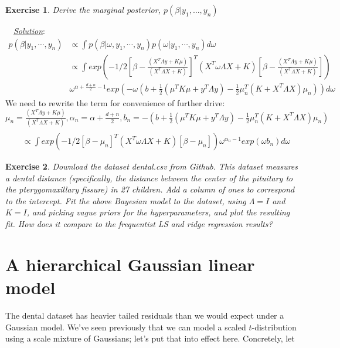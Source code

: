 \documentclass[twoside]{article}
\newcounter{lecnum}
\newtheorem{exercise}{Exercise}[lecnum]
\newenvironment{solution}{
  \begin{flushleft} \noindent ~~\underline{\emph{Solution}}: \rmfamily}{\end{flushleft}}
\begin{document}
\begin{exercise}
  Derive the marginal posterior, $p(\beta|y_1,\dots, y_n)$
\end{exercise}
\begin{solution}
\begin{equation}
\begin{split}
p(\beta|y_1, \cdots, y_n) & \propto \int p(\beta | \omega, y_1, \cdots, y_n) p(\omega | y_1, \cdots, y_n) d\omega
\\ & \propto \int
exp(-1/2[\beta - \frac{(X^T  \Lambda y  + K \mu)}{(X^T \Lambda X +K)}]^T(X^T\omega \Lambda X +K)[\beta - \frac{(X^T \Lambda y  + K \mu)}{(X^T\Lambda X +K)}]) \\&
\omega ^ {\alpha +\frac{d+n}{2} - 1} exp (- \omega (b+ \frac{1}{2} (\mu^TK\mu + y^T\Lambda y)- \frac{1}{2} \mu_n^T (K+X^T\Lambda X)\mu_n)) 
d\omega
\end{split}
\end{equation}
We need to rewrite the term for convenience of further drive: $\mu_n =  \frac{(X^T  \Lambda y  + K \mu)}{(X^T \Lambda X +K)}, \alpha_n = \alpha +\frac{d+n}{2} , b_n = - (b+ \frac{1}{2} (\mu^TK\mu + y^T\Lambda y)- \frac{1}{2} \mu_n^T (K+X^T\Lambda X)\mu_n)$
\begin{equation}
\begin{split}
\\ & \propto \int
exp(-1/2[\beta - \mu_n]^T(X^T\omega \Lambda X +K)[\beta - \mu_n]) \omega ^ {\alpha_n - 1} exp (\omega b_n) 
d\omega
\end{split}
\end{equation}
\end{solution}

\begin{exercise}
  Download the dataset dental.csv from Github. This dataset measures a dental distance (specifically, the distance between the center of the pituitary to the pterygomaxillary fissure) in 27 children. Add a column of ones to correspond to the intercept. Fit the above Bayesian model to the dataset, using $\Lambda=I$ and $K=I$, and picking vague priors for the hyperparameters, and plot the resulting fit. How does it compare to the frequentist LS and ridge regression results?
\end{exercise}



\section{A hierarchical Gaussian linear model}
The dental dataset has heavier tailed residuals than we would expect under a Gaussian model. We've seen previously that we can model a scaled $t$-distribution using a scale mixture of Gaussians; let's put that into effect here. Concretely, let
\end{document}
